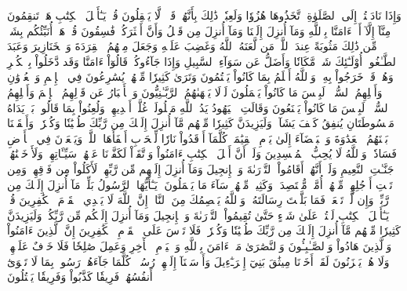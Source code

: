 وَإِذَا نَادَيۡتُمۡ إِلَى ٱلصَّلَوٰةِ ٱتَّخَذُوهَا هُزُوٗا وَلَعِبٗاۚ ذَٰلِكَ بِأَنَّهُمۡ قَوۡمٞ لَّا يَعۡقِلُونَ
قُلۡ يَـٰٓأَهۡلَ ٱلۡكِتَٰبِ هَلۡ تَنقِمُونَ مِنَّآ إِلَّآ أَنۡ ءَامَنَّا بِٱللَّهِ وَمَآ أُنزِلَ إِلَيۡنَا وَمَآ أُنزِلَ مِن قَبۡلُ وَأَنَّ أَكۡثَرَكُمۡ فَٰسِقُونَ
قُلۡ هَلۡ أُنَبِّئُكُم بِشَرّٖ مِّن ذَٰلِكَ مَثُوبَةً عِندَ ٱللَّهِۚ مَن لَّعَنَهُ ٱللَّهُ وَغَضِبَ عَلَيۡهِ وَجَعَلَ مِنۡهُمُ ٱلۡقِرَدَةَ وَٱلۡخَنَازِيرَ وَعَبَدَ ٱلطَّـٰغُوتَۚ أُوْلَـٰٓئِكَ شَرّٞ مَّكَانٗا وَأَضَلُّ عَن سَوَآءِ ٱلسَّبِيلِ
وَإِذَا جَآءُوكُمۡ قَالُوٓاْ ءَامَنَّا وَقَد دَّخَلُواْ بِٱلۡكُفۡرِ وَهُمۡ قَدۡ خَرَجُواْ بِهِۦۚ وَٱللَّهُ أَعۡلَمُ بِمَا كَانُواْ يَكۡتُمُونَ
وَتَرَىٰ كَثِيرٗا مِّنۡهُمۡ يُسَٰرِعُونَ فِي ٱلۡإِثۡمِ وَٱلۡعُدۡوَٰنِ وَأَكۡلِهِمُ ٱلسُّحۡتَۚ لَبِئۡسَ مَا كَانُواْ يَعۡمَلُونَ
لَوۡلَا يَنۡهَىٰهُمُ ٱلرَّبَّـٰنِيُّونَ وَٱلۡأَحۡبَارُ عَن قَوۡلِهِمُ ٱلۡإِثۡمَ وَأَكۡلِهِمُ ٱلسُّحۡتَۚ لَبِئۡسَ مَا كَانُواْ يَصۡنَعُونَ
وَقَالَتِ ٱلۡيَهُودُ يَدُ ٱللَّهِ مَغۡلُولَةٌۚ غُلَّتۡ أَيۡدِيهِمۡ وَلُعِنُواْ بِمَا قَالُواْۘ بَلۡ يَدَاهُ مَبۡسُوطَتَانِ يُنفِقُ كَيۡفَ يَشَآءُۚ وَلَيَزِيدَنَّ كَثِيرٗا مِّنۡهُم مَّآ أُنزِلَ إِلَيۡكَ مِن رَّبِّكَ طُغۡيَٰنٗا وَكُفۡرٗاۚ وَأَلۡقَيۡنَا بَيۡنَهُمُ ٱلۡعَدَٰوَةَ وَٱلۡبَغۡضَآءَ إِلَىٰ يَوۡمِ ٱلۡقِيَٰمَةِۚ كُلَّمَآ أَوۡقَدُواْ نَارٗا لِّلۡحَرۡبِ أَطۡفَأَهَا ٱللَّهُۚ وَيَسۡعَوۡنَ فِي ٱلۡأَرۡضِ فَسَادٗاۚ وَٱللَّهُ لَا يُحِبُّ ٱلۡمُفۡسِدِينَ
وَلَوۡ أَنَّ أَهۡلَ ٱلۡكِتَٰبِ ءَامَنُواْ وَٱتَّقَوۡاْ لَكَفَّرۡنَا عَنۡهُمۡ سَيِّـَٔاتِهِمۡ وَلَأَدۡخَلۡنَٰهُمۡ جَنَّـٰتِ ٱلنَّعِيمِ
وَلَوۡ أَنَّهُمۡ أَقَامُواْ ٱلتَّوۡرَىٰةَ وَٱلۡإِنجِيلَ وَمَآ أُنزِلَ إِلَيۡهِم مِّن رَّبِّهِمۡ لَأَكَلُواْ مِن فَوۡقِهِمۡ وَمِن تَحۡتِ أَرۡجُلِهِمۚ مِّنۡهُمۡ أُمَّةٞ مُّقۡتَصِدَةٞۖ وَكَثِيرٞ مِّنۡهُمۡ سَآءَ مَا يَعۡمَلُونَ
۞يَـٰٓأَيُّهَا ٱلرَّسُولُ بَلِّغۡ مَآ أُنزِلَ إِلَيۡكَ مِن رَّبِّكَۖ وَإِن لَّمۡ تَفۡعَلۡ فَمَا بَلَّغۡتَ رِسَالَتَهُۥۚ وَٱللَّهُ يَعۡصِمُكَ مِنَ ٱلنَّاسِۗ إِنَّ ٱللَّهَ لَا يَهۡدِي ٱلۡقَوۡمَ ٱلۡكَٰفِرِينَ
قُلۡ يَـٰٓأَهۡلَ ٱلۡكِتَٰبِ لَسۡتُمۡ عَلَىٰ شَيۡءٍ حَتَّىٰ تُقِيمُواْ ٱلتَّوۡرَىٰةَ وَٱلۡإِنجِيلَ وَمَآ أُنزِلَ إِلَيۡكُم مِّن رَّبِّكُمۡۗ وَلَيَزِيدَنَّ كَثِيرٗا مِّنۡهُم مَّآ أُنزِلَ إِلَيۡكَ مِن رَّبِّكَ طُغۡيَٰنٗا وَكُفۡرٗاۖ فَلَا تَأۡسَ عَلَى ٱلۡقَوۡمِ ٱلۡكَٰفِرِينَ
إِنَّ ٱلَّذِينَ ءَامَنُواْ وَٱلَّذِينَ هَادُواْ وَٱلصَّـٰبِـُٔونَ وَٱلنَّصَٰرَىٰ مَنۡ ءَامَنَ بِٱللَّهِ وَٱلۡيَوۡمِ ٱلۡأٓخِرِ وَعَمِلَ صَٰلِحٗا فَلَا خَوۡفٌ عَلَيۡهِمۡ وَلَا هُمۡ يَحۡزَنُونَ
لَقَدۡ أَخَذۡنَا مِيثَٰقَ بَنِيٓ إِسۡرَـٰٓءِيلَ وَأَرۡسَلۡنَآ إِلَيۡهِمۡ رُسُلٗاۖ كُلَّمَا جَآءَهُمۡ رَسُولُۢ بِمَا لَا تَهۡوَىٰٓ أَنفُسُهُمۡ فَرِيقٗا كَذَّبُواْ وَفَرِيقٗا يَقۡتُلُونَ

